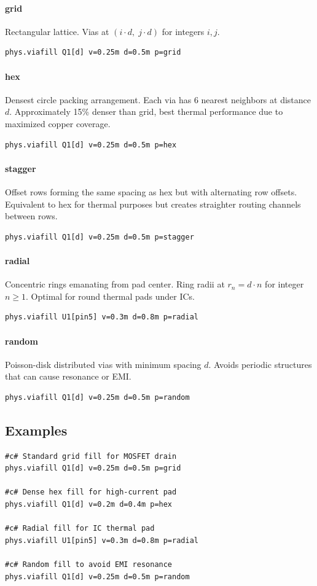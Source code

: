 \paragraph{grid}
Rectangular lattice. Vias at $(i \cdot d, \; j \cdot d)$ for integers $i, j$.
\begin{verbatim}
phys.viafill Q1[d] v=0.25m d=0.5m p=grid
\end{verbatim}

\paragraph{hex}
Densest circle packing arrangement. Each via has 6 nearest neighbors at distance $d$. Approximately 15\% denser than grid, best thermal performance due to maximized copper coverage.
\begin{verbatim}
phys.viafill Q1[d] v=0.25m d=0.5m p=hex
\end{verbatim}

\paragraph{stagger}
Offset rows forming the same spacing as hex but with alternating row offsets. Equivalent to hex for thermal purposes but creates straighter routing channels between rows.
\begin{verbatim}
phys.viafill Q1[d] v=0.25m d=0.5m p=stagger
\end{verbatim}

\paragraph{radial}
Concentric rings emanating from pad center. Ring radii at $r_n = d \cdot n$ for integer $n \geq 1$. Optimal for round thermal pads under ICs.
\begin{verbatim}
phys.viafill U1[pin5] v=0.3m d=0.8m p=radial
\end{verbatim}

\paragraph{random}
Poisson-disk distributed vias with minimum spacing $d$. Avoids periodic structures that can cause resonance or EMI.
\begin{verbatim}
phys.viafill Q1[d] v=0.25m d=0.5m p=random
\end{verbatim}

\subsection{Examples}
\begin{verbatim}
#c# Standard grid fill for MOSFET drain
phys.viafill Q1[d] v=0.25m d=0.5m p=grid

#c# Dense hex fill for high-current pad
phys.viafill Q1[d] v=0.2m d=0.4m p=hex

#c# Radial fill for IC thermal pad
phys.viafill U1[pin5] v=0.3m d=0.8m p=radial

#c# Random fill to avoid EMI resonance
phys.viafill Q1[d] v=0.25m d=0.5m p=random
\end{verbatim}

